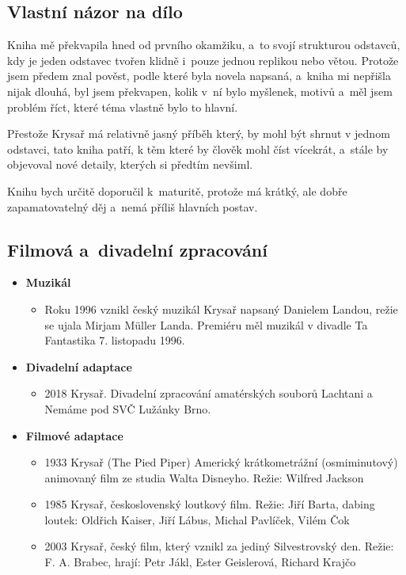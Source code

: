 \subsection{Vlastní názor na dílo}
Kniha mě překvapila hned od prvního okamžiku, a~to svojí strukturou odstavců, kdy je jeden odstavec tvořen klidně i~pouze jednou replikou nebo větou. Protože jsem předem znal pověst, podle které byla novela napsaná, a~kniha mi nepřišla nijak dlouhá, byl jsem překvapen, kolik v~ní bylo myšlenek, motivů a~měl jsem problém říct, které téma vlastně bylo to hlavní. %

Přestože Krysař má relativně jasný příběh který, by mohl být shrnut v jednom odstavci, tato kniha patří, k těm které by člověk mohl číst vícekrát, a~stále by objevoval nové detaily, kterých si předtím nevšiml. %

Knihu bych určitě doporučil k~maturitě, protože má krátký, ale dobře zapamatovatelný děj a~nemá příliš hlavních postav.  %

\subsection{Filmová a~divadelní zpracování\cite{wiki:Krysař}}
\begin{itemize}
    \item \textbf{Muzikál}
    \begin{itemize}
    	\item Roku 1996 vznikl český muzikál Krysař napsaný Danielem Landou, režie se ujala Mirjam Müller Landa. Premiéru měl muzikál v divadle Ta Fantastika 7. listopadu 1996.
    \end{itemize}

    \item \textbf{Divadelní adaptace}
    \begin{itemize}
    	\item 2018 Krysař. Divadelní zpracování amatérských souborů Lachtani a Nemáme pod SVČ Lužánky Brno.
    \end{itemize}

    \item \textbf{Filmové adaptace}
    \begin{itemize}
    	\item 1933 Krysař (The Pied Piper) Americký krátkometrážní (osmiminutový) animovaný film ze studia Walta Disneyho. Režie: Wilfred Jackson
        \item 1985 Krysař, československý loutkový film. Režie: Jiří Barta, dabing loutek: Oldřich Kaiser, Jiří Lábus, Michal Pavlíček, Vilém Čok
        \item 2003 Krysař, český film, který vznikl za jediný Silvestrovský den. Režie: F. A. Brabec, hrají: Petr Jákl, Ester Geislerová, Richard Krajčo
    \end{itemize}

\end{itemize}

\newpage
